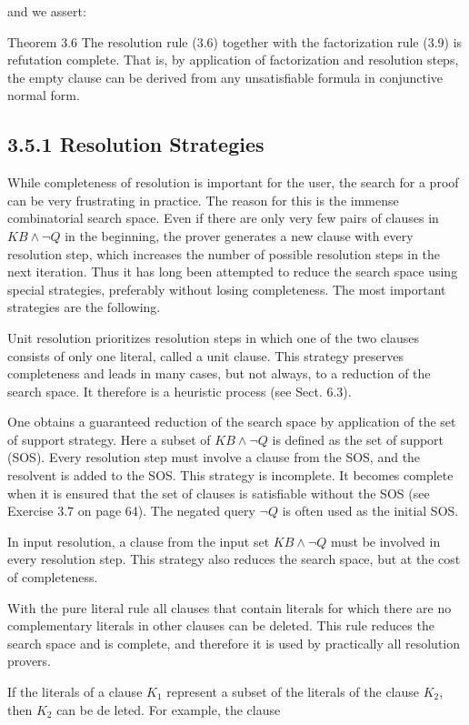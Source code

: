\documentclass[10pt]{article}
\begin{document}
and we assert:

Theorem 3.6 The resolution rule (3.6) together with the factorization rule (3.9) is refutation complete. That is, by application of factorization and resolution steps, the empty clause can be derived from any unsatisfiable formula in conjunctive normal form.

\subsection*{3.5.1 Resolution Strategies}
While completeness of resolution is important for the user, the search for a proof can be very frustrating in practice. The reason for this is the immense combinatorial search space. Even if there are only very few pairs of clauses in $K B \wedge \neg Q$ in the beginning, the prover generates a new clause with every resolution step, which increases the number of possible resolution steps in the next iteration. Thus it has long been attempted to reduce the search space using special strategies, preferably without losing completeness. The most important strategies are the following.

Unit resolution prioritizes resolution steps in which one of the two clauses consists of only one literal, called a unit clause. This strategy preserves completeness and leads in many cases, but not always, to a reduction of the search space. It therefore is a heuristic process (see Sect. 6.3).

One obtains a guaranteed reduction of the search space by application of the set of support strategy. Here a subset of $K B \wedge \neg Q$ is defined as the set of support (SOS). Every resolution step must involve a clause from the SOS, and the resolvent is added to the SOS. This strategy is incomplete. It becomes complete when it is ensured that the set of clauses is satisfiable without the SOS (see Exercise 3.7 on page 64). The negated query $\neg Q$ is often used as the initial SOS.

In input resolution, a clause from the input set $K B \wedge \neg Q$ must be involved in every resolution step. This strategy also reduces the search space, but at the cost of completeness.

With the pure literal rule all clauses that contain literals for which there are no complementary literals in other clauses can be deleted. This rule reduces the search space and is complete, and therefore it is used by practically all resolution provers.

If the literals of a clause $K_{1}$ represent a subset of the literals of the clause $K_{2}$, then $K_{2}$ can be de
leted. For example, the clause
\end{document}
